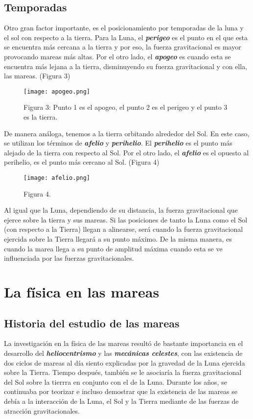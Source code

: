 \documentclass{article}
\begin{document}
\subsection{\Large Temporadas}
Otro gran factor importante, es el posicionamiento por temporadas de la luna y el sol con respecto a la tierra. Para la Luna, el \textit{\textbf{perigeo}} es el punto en el que esta se encuentra más cercana a la tierra y por eso, la fuerza gravitacional es mayor provocando mareas más altas. Por el otro lado, el \textit{\textbf{apogeo}} es cuando esta se encuentra más lejana a la tierra, disminuyendo su fuerza gravitacional y con ella, las mareas. (Figura 3)\\

\begin{figure}[ht!]
\centering
\texttt{[image: apogeo.png]}
\caption{Figura 3: Punto 1 es el apogeo, el punto 2 es el perigeo y el punto 3 es la tierra.}
\end{figure}

 De manera análoga, tenemos a la tierra orbitando alrededor del Sol. En este caso, se utilizan los términos de \textit{\textbf{afelio}} y \textit{\textbf{perihelio}}. El \textit{\textbf{perihelio}} es el punto más alejado de la tierra con respecto al Sol. Por el otro lado, el \textit{\textbf{afelio}} es el opuesto al perihelio, es el punto más cercano al Sol. (Figura 4)\\
\begin{figure}[ht!]
\centering
\texttt{[image: afelio.png]}
\caption{Figura 4.}
\end{figure} 
 
Al igual que la Luna, dependiendo de su distancia, la fuerza gravitacional que ejerce sobre la tierra y sus mareas. Si las posiciones de tanto la Luna como el Sol (con respecto a la Tierra) llegan a alinearse, será cuando la fuerza gravitacional ejercida sobre la Tierra llegará a su punto máximo. De la misma manera, es cuando la marea llega a su punto de amplitud máxima cuando esta se ve influenciada por las fuerzas gravitacionales.

\section{La física en las mareas}
\subsection{Historia del estudio de las mareas}
La investigación en la física de las mareas resultó de bastante importancia en el desarrollo del \textit{\textbf{heliocentrismo}} y las \textit{\textbf{mecánicas celestes}}, con las existencia de dos ciclos de mareas al día siento explicadas por la gravedad de la Luna ejercida sobre la Tierra. Tiempo después, también se le asociaría la fuerza gravitacional del Sol sobre la tierrra en conjunto con el de la Luna. Durante los años, se continuaba por teorizar e incluso demostrar que la existencia de las mareas se debía a la interacción de la Luna, el Sol y la Tierra mediante de las fuerzas de atracción gravitacionales.\\
\end{document}
